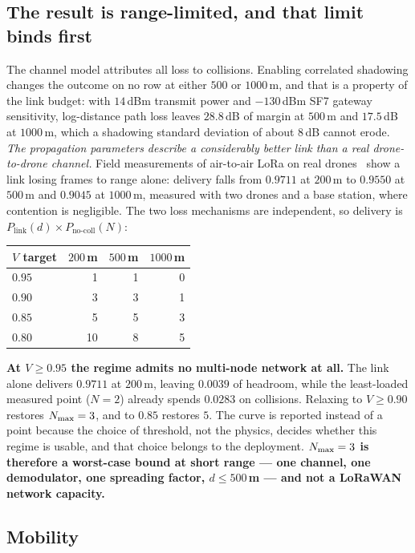 \subsection{The result is range-limited, and that limit binds first}

The channel model attributes all loss to collisions. Enabling correlated shadowing changes the
outcome on no row at either $500$ or $1000$\,m, and that is a property of the link budget: with
$14$\,dBm transmit power and $-130$\,dBm SF7 gateway sensitivity, log-distance path loss leaves
$28.8$\,dB of margin at $500$\,m and $17.5$\,dB at $1000$\,m, which a shadowing standard
deviation of about $8$\,dB cannot erode. \emph{The propagation parameters describe a considerably
better link than a real drone-to-drone channel.} Field measurements of air-to-air LoRa on real
drones~\cite{zirak2021swarm} show a link losing frames to range alone: delivery falls from
$0.9711$ at $200$\,m to $0.9550$ at $500$\,m and $0.9045$ at $1000$\,m, measured with two drones
and a base station, where contention is negligible. The two loss mechanisms are independent, so
delivery is $P_{\text{link}}(d) \times P_{\text{no-coll}}(N)$:

\begin{center}
\begin{tabular}{lrrr}
\toprule
$V$ target & $200$\,m & $500$\,m & $1000$\,m \\
\midrule
$0.95$ & 1 & 1 & 0 \\
$0.90$ & 3 & 3 & 1 \\
$0.85$ & 5 & 5 & 3 \\
$0.80$ & 10 & 8 & 5 \\
\bottomrule
\end{tabular}
\end{center}

\textbf{At $V \geq 0.95$ the regime admits no multi-node network at all.} The link alone
delivers $0.9711$ at $200$\,m, leaving $0.0039$ of headroom, while the least-loaded measured point
($N{=}2$) already spends $0.0283$ on collisions. Relaxing to $V \geq 0.90$ restores $N_{\max} = 3$,
and to $0.85$ restores $5$. The curve is reported instead of a point because the choice of
threshold, not the physics, decides whether this regime is usable, and that choice belongs to the
deployment. \textbf{$N_{\max}=3$ is therefore a worst-case bound at short range --- one channel, one
demodulator, one spreading factor, $d \leq 500$\,m --- and not a LoRaWAN network capacity.}

\subsection{Mobility}\label{sec:lora-mobility}

